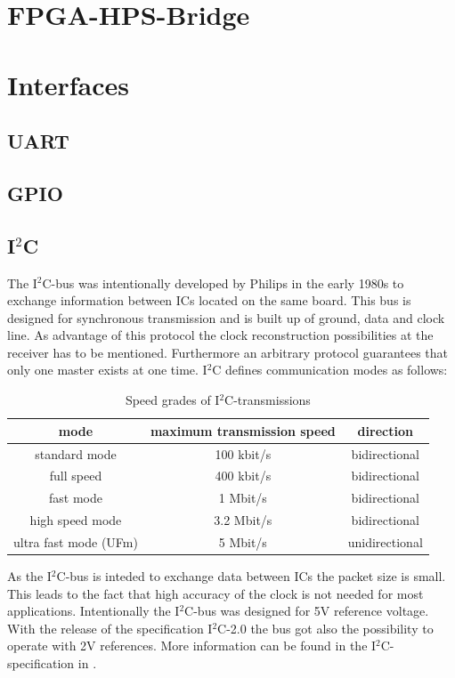 \section{FPGA-HPS-Bridge}
\section{Interfaces}
\subsection{UART}
\subsection{GPIO}
\subsection{I$^2$C}
The I$^2$C-bus was intentionally developed by Philips in the early 1980s to exchange information between ICs located on the same board. This bus is designed for synchronous transmission and is built up of ground, data and clock line. As advantage of this protocol the clock reconstruction possibilities at the receiver has to be mentioned. Furthermore an arbitrary protocol guarantees that only one master exists at one time.\cite{Wue06} I$^2$C defines communication modes as follows:
\begin{table}
\begin{center}
\begin{tabular}{|c||c|c|}
\hline
mode & maximum transmission speed & direction\\
\hline\hline
standard mode & 100 kbit/s & bidirectional\\
\hline
full speed & 400 kbit/s & bidirectional\\
\hline
fast mode & 1 Mbit/s & bidirectional\\
\hline
high speed mode & 3.2 Mbit/s & bidirectional\\
\hline
ultra fast mode (UFm) & 5 Mbit/s & unidirectional\\
\hline
\end{tabular}
\caption{Speed grades of I$^2$C-transmissions\cite{I2Cspeed}}
\label{tab:rsstates}
\end{center}
\end{table}
As the I$^2$C-bus is inteded to exchange data between ICs the packet size is small. This leads to the fact that high accuracy of the clock is not needed for most applications.\cite{I2Cspeed} Intentionally the I$^2$C-bus was designed for 5V reference voltage. With the release of the specification I$^2$C-2.0 the bus got also the possibility to operate with 2V references.\cite{I2Cvoltage}
More information can be found in the I$^2$C-specification in \cite{I2Cspec}.
